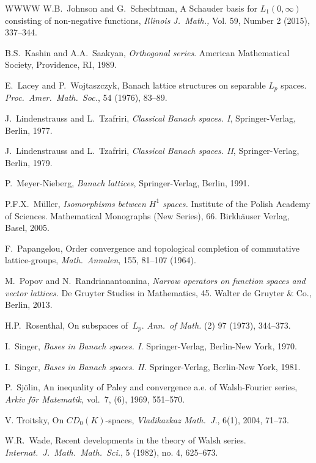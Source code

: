 \documentclass[12pt]{amsart}
\theoremstyle{plain}
\theoremstyle{definition}
\begin{document}
\begin{thebibliography}{WWWW}
  W.B.~Johnson and G.~Schechtman,
  A Schauder basis for $L_1(0,\infty)$ consisting of non-negative
  functions,
  \textit{Illinois J.\ Math.,} Vol. 59, Number 2 (2015), 337--344.

  B.S.~Kashin and A.A.~Saakyan, \emph{Orthogonal series}.
  American Mathematical Society, Providence, RI, 1989.

  E.~Lacey and P.~Wojtaszczyk,
  Banach lattice structures on separable $L_p$ spaces.
  \emph{Proc.\ Amer.\ Math.\ Soc.}, 54 (1976), 83--89. 
  
J.~Lindenstrauss and L.~Tzafriri,
\emph{Classical {B}anach spaces. {I}}, Springer-Verlag, Berlin,
  1977.

J.~Lindenstrauss and L.~Tzafriri,
\emph{Classical {B}anach spaces. {I}{I}}, Springer-Verlag, Berlin,
  1979.

P.~Meyer-Nieberg,
\emph{Banach lattices},
Springer-Verlag, Berlin, 1991.

  P.F.X.~M\"uller, \emph{Isomorphisms between $H^1$ spaces.}
  Institute of the Polish Academy of Sciences. Mathematical Monographs
  (New Series), 66.
  Birkh\"auser Verlag, Basel, 2005.
  
  F.~Papangelou,
  Order convergence and topological completion of commutative
  lattice-groups,
  \textit{Math.\ Annalen}, 155, 81--107 (1964).

   M.~Popov and N.~Randrianantoanina, 
   \emph{Narrow operators on function spaces and vector lattices.}
  De Gruyter Studies in Mathematics, 45. Walter de Gruyter \& Co.,
  Berlin, 2013.
  
 H.P.~Rosenthal, On subspaces of~$L_p$.
 \emph{Ann.\ of Math.} (2) 97 (1973), 344--373.  

I.~Singer, \emph{Bases in Banach spaces. I.}  Springer-Verlag,
Berlin-New York, 1970.

I.~Singer, \emph{Bases in Banach spaces. II.}  Springer-Verlag,
Berlin-New York, 1981.

  P.~Sj\"olin, 
  An inequality of Paley and convergence a.e. of Walsh-Fourier series,
  \emph{Arkiv f\"or Matematik,} vol.~7, (6), 1969, 551--570.

  V. Troitsky, On $CD_0(K)$-spaces, \emph{Vladikavkaz Math.\ J.}, 6(1),
  2004, 71--73.

  W.R.~Wade,
  Recent developments in the theory of Walsh series.
  \emph{Internat.\ J.\ Math.\ Math.\ Sci.},
  5 (1982), no. 4, 625--673.

\end{thebibliography}
  
\end{document}
